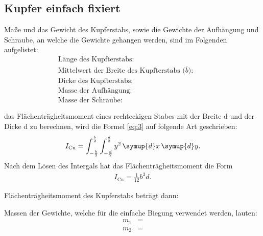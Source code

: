 \subsection{Kupfer einfach fixiert}

\justifying Maße und das Gewicht des Kupferstabs, sowie die Gewichte der Aufhängung und Schraube, an welche die Gewichte gehangen 
werden, sind im Folgenden aufgelistet: 
\begin{subequations}\label{eq:8}
\begin{align}
    &\text{Länge des Kupfterstabs:} \qquad &\text{} \label{eq:8a}\\
    &\text{Mittelwert der Breite des Kupfterstabs ($\overline{b}$):} \qquad &\text{} \label{eq:8b}\\
    &\text{Dicke des Kupfterstabs:} \qquad &\text{} \label{eq:8c}\\
    &\text{Masse der Aufhängung:} \qquad &\text{} \label{eq:8d}\\
    &\text{Masse der Schraube:} \qquad &\text{} \label{eq:8e}
\end{align}
\end{subequations}

\justifying das Flächenträgheitsmoment eines rechteckigen Stabes mit der Breite d und der
Dicke d zu berechnen, wird die Formel \eqref{eq:3} auf folgende Art
geschrieben:
\begin{align}
    I_{\text{Cu}}=\int_{-\frac{b}{2}}^{\frac{b}{2}} \int_{-\frac{d}{2}}^{\frac{d}{2}} y^2 \, \symup{d}x \, \symup{d}y \label{eq:9}.
\end{align}
Nach dem Lösen des Intergals hat das Flächenträgheitsmoment die Form
\begin{align}
     I_{\text{Cu}}=\frac{1}{12} b^3d. \label{eq:10}
\end{align}

\justifying Flächenträgheitsmoment des Kupferstabs beträgt dann:


\justifying Massen der Gewichte, welche für die einfache Biegung verwendet werden, lauten:
\begin{subequations}\label{eq:}
\begin{align}
    m_1 &= \text{} \label{eq:a}\\
    m_2 &= \text{} \label{eq:b}
\end{align}
\end{subequations}

